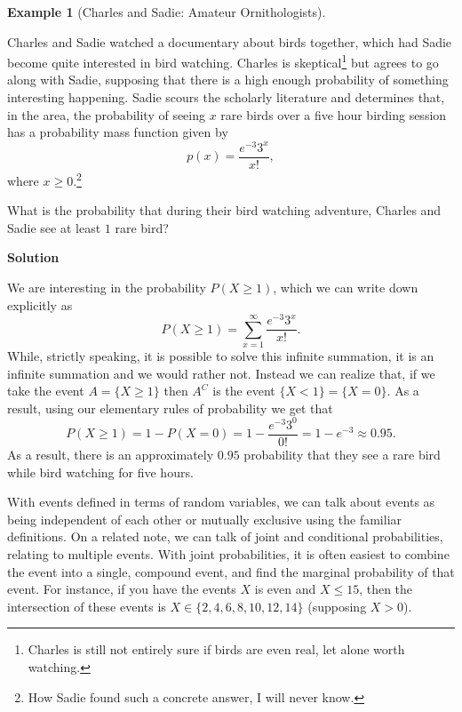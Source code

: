 \documentclass[
  letterpaper,
  DIV=11,
  numbers=noendperiod]{scrreprt}
\theoremstyle{definition}
\theoremstyle{definition}
\newtheorem{example}{Example}[chapter]
\theoremstyle{definition}
\theoremstyle{remark}
\begin{document}
\begin{example}[Charles and Sadie: Amateur
Ornithologists]\protect\hypertarget{exm-probability-calc}{}\label{exm-probability-calc}

Charles and Sadie watched a documentary about birds together, which had
Sadie become quite interested in bird watching. Charles is
skeptical\footnote{Charles is still not entirely sure if birds are even
  real, let alone worth watching.} but agrees to go along with Sadie,
supposing that there is a high enough probability of something
interesting happening. Sadie scours the scholarly literature and
determines that, in the area, the probability of seeing \(x\) rare birds
over a five hour birding session has a probability mass function given
by \[p(x) = \frac{e^{-3}3^x}{x!},\] where \(x\geq 0\).\footnote{How
  Sadie found such a concrete answer, I will never know.}

What is the probability that during their bird watching adventure,
Charles and Sadie see at least \(1\) rare bird?

\begin{tcolorbox}[enhanced jigsaw, colback=white, colframe=quarto-callout-color-frame, arc=.35mm, leftrule=.75mm, rightrule=.15mm, opacityback=0, breakable, bottomrule=.15mm, left=2mm, toprule=.15mm]

\vspace{-3mm}\textbf{Solution}\vspace{3mm}

We are interesting in the probability \(P(X \geq 1)\), which we can
write down explicitly as
\[P(X \geq 1) = \sum_{x=1}^\infty \frac{e^{-3}3^x}{x!}.\] While,
strictly speaking, it is possible to solve this infinite summation, it
is an infinite summation and we would rather not. Instead we can realize
that, if we take the event \(A = \{X \geq 1\}\) then \(A^C\) is the
event \(\{X < 1\} = \{X = 0\}\). As a result, using our elementary rules
of probability we get that
\[P(X \geq 1) = 1 - P(X = 0) = 1 - \frac{e^{-3}3^{0}}{0!} = 1 - e^{-3} \approx 0.95.\]
As a result, there is an approximately \(0.95\) probability that they
see a rare bird while bird watching for five hours.

\end{tcolorbox}

\end{example}

With events defined in terms of random variables, we can talk about
events as being independent of each other or mutually exclusive using
the familiar definitions. On a related note, we can talk of joint and
conditional probabilities, relating to multiple events. With joint
probabilities, it is often easiest to combine the event into a single,
compound event, and find the marginal probability of that event. For
instance, if you have the events \(X\) is even and \(X \leq 15\), then
the intersection of these events is \(X \in \{2,4,6,8,10,12,14\}\)
(supposing \(X > 0\)).
\end{document}
